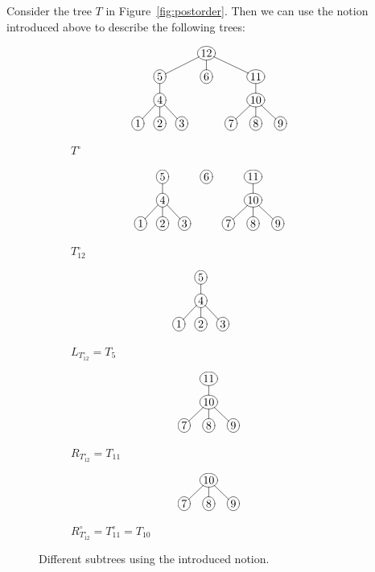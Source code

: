 \begin{rem}
Consider the tree $T$ in Figure~\ref{fig:postorder}. Then we can use the notion introduced above to describe the following trees:
\begin{figure}[!ht]
	\begin{subfigure}[b]{0.49\textwidth}
	\caption{$T^{\circ}$}
	\begin{displaymath}
	\xymatrix @R=3mm @C=3mm{
		&&&*+[o][F-]{12}\ar@{-}[d] \ar@{-}[dll] \ar@{-}[drr]&&\\
		&*+[o][F-]{5} \ar@{-}[d]&&*+[o][F-]{6}&&*+[o][F-]{11} \ar@{-}[d]\\
		&*+[o][F-]{4} \ar@{-}[dl] \ar@{-}[d] \ar@{-}[dr]&&&&*+[o][F-]{10} \ar@{-}[dl] \ar@{-}[d] \ar@{-}[dr]\\
		*+[o][F-]{1}&*+[o][F-]{2}&*+[o][F-]{3}&&*+[o][F-]{7}&*+[o][F-]{8}&*+[o][F-]{9}	
	}
	\end{displaymath}
	\end{subfigure}
	\begin{subfigure}[b]{0.49\textwidth}
	\caption{$T_{12}^{\circ}$}
	\begin{displaymath}
	\xymatrix @R=3mm @C=3mm{
		&*+[o][F-]{5} \ar@{-}[d]&&*+[o][F-]{6}&&*+[o][F-]{11} \ar@{-}[d]\\
		&*+[o][F-]{4} \ar@{-}[dl] \ar@{-}[d] \ar@{-}[dr]&&&&*+[o][F-]{10} \ar@{-}[dl] \ar@{-}[d] \ar@{-}[dr]\\
		*+[o][F-]{1}&*+[o][F-]{2}&*+[o][F-]{3}&&*+[o][F-]{7}&*+[o][F-]{8}&*+[o][F-]{9}	
	}
	\end{displaymath}
	\end{subfigure}
	\begin{subfigure}[b]{0.32\textwidth}
	\caption{$L_{T_{12}^{\circ}} = T_5$}
	\begin{displaymath}
	\xymatrix @R=3mm @C=3mm{
		&*+[o][F-]{5} \ar@{-}[d]&\\
		&*+[o][F-]{4} \ar@{-}[dl] \ar@{-}[d] \ar@{-}[dr]&\\
		*+[o][F-]{1}&*+[o][F-]{2}&*+[o][F-]{3}&
	}
	\end{displaymath}
	\end{subfigure}
	\begin{subfigure}[b]{0.32\textwidth}
	\caption{$R_{T_{12}^{\circ}} = T_{11}$}
	\begin{displaymath}
	\xymatrix @R=3mm @C=3mm{
		&*+[o][F-]{11} \ar@{-}[d]\\
		&*+[o][F-]{10} \ar@{-}[dl] \ar@{-}[d] \ar@{-}[dr]\\
		*+[o][F-]{7}&*+[o][F-]{8}&*+[o][F-]{9}	
	}
	\end{displaymath}
	\end{subfigure}
	\begin{subfigure}[b]{0.32\textwidth}
	\caption{$R_{T_{12}^{\circ}}^{\circ} = T_{11}^{\circ} = T_{10}$}
	\begin{displaymath}
	\xymatrix @R=3mm @C=3mm{
		&*+[o][F-]{10} \ar@{-}[dl] \ar@{-}[d] \ar@{-}[dr]\\
		*+[o][F-]{7}&*+[o][F-]{8}&*+[o][F-]{9}	
	}
	\end{displaymath}
	\end{subfigure}
	\caption{Different subtrees using the introduced notion.}
	\label{fig:subtrees}
\end{figure} 
\end{rem}
